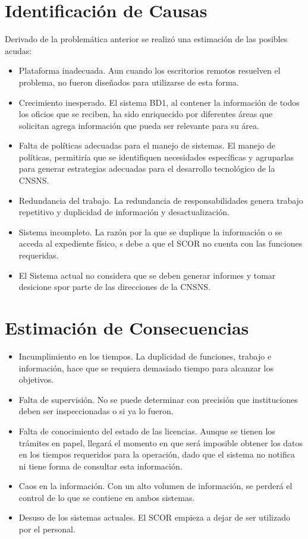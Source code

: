 \documentclass[10pt]{book}
\begin{document}
\section{Identificación de Causas}

Derivado de la problemática anterior se realizó una estimación de las posibles acudas:

\begin{itemize}	
	\item Plataforma inadecuada. Aun cuando los escritorios remotos resuelven el problema, no fueron diseñados para utilizarse de esta forma.
	\item Crecimiento inesperado. El sistema BD1, al contener la información de todos los oficios que se reciben, ha sido enriquecido por diferentes áreas que solicitan agrega información que pueda ser relevante para su área.
	\item Falta de políticas adecuadas para el manejo de sistemas. El manejo de políticas, permitiría que se identifiquen necesidades específicas y agruparlas para generar estrategias adecuadas para el desarrollo tecnológico de la CNSNS.
	\item Redundancia del trabajo. La redundancia de responsabilidades genera trabajo repetitivo y duplicidad de información y desactualización.
	\item Sistema incompleto. La razón por la que se duplique la información o se acceda al expediente físico, s debe a que el SCOR no cuenta con las funciones requeridas.
	\item El Sistema actual no considera que se deben generar informes y tomar desicione spor parte de las direcciones de la CNSNS.
\end{itemize}

\section{Estimación de Consecuencias}

\begin{itemize}	
	\item Incumplimiento en los tiempos. La duplicidad de funciones, trabajo e información, hace que se requiera demasiado tiempo para alcanzar los objetivos.
	\item Falta de supervisión. No se puede determinar con precisión que instituciones deben ser inspeccionadas o si ya lo fueron.
	\item Falta de conocimiento del estado de las licencias. Aunque se tienen los trámites en papel, llegará el momento en que será imposible obtener los datos en los tiempos requeridos para la operación, dado que el sistema no notifica ni tiene forma de consultar esta información.
	\item Caos en la información. Con un alto volumen de información, se perderá el control de lo que se contiene en ambos sistemas.
	\item Desuso de los sistemas actuales. El SCOR empieza a dejar de ser utilizado por el personal.
\end{itemize}
\end{document}
